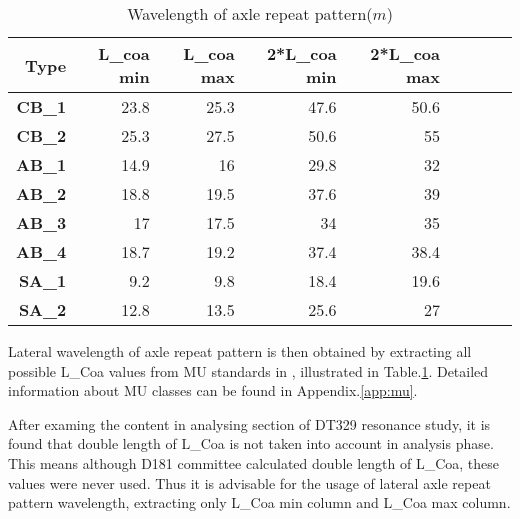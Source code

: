 \begin{table}[h!]
  \centering
  \caption{Wavelength of axle repeat pattern($m$)}
    \begin{tabular}{rrrrrrrrr}
    \toprule
    \textbf{Type} & \textbf{L\_coa min} & \textbf{L\_coa max} & \textbf{2*L\_coa min } & \textbf{2*L\_coa max} \\
    \midrule
    \textbf{CB\_1} & 23.8  & 25.3  & 47.6  & 50.6 \\
    \textbf{CB\_2} & 25.3  & 27.5  & 50.6  & 55    \\
    \textbf{AB\_1} & 14.9  & 16    & 29.8  & 32     \\
    \textbf{AB\_2} & 18.8  & 19.5  & 37.6  & 39    \\
    \textbf{AB\_3} & 17    & 17.5  & 34    & 35   \\
    \textbf{AB\_4} & 18.7  & 19.2  & 37.4  & 38.4  \\
    \textbf{SA\_1} & 9.2   & 9.8   & 18.4  & 19.6  \\
    \textbf{SA\_2} & 12.8  & 13.5  & 25.6  & 27    \\

    \bottomrule
    \end{tabular}%
  \label{tab:wavelengthaxlerepeat}%
\end{table}%

Lateral wavelength of axle repeat pattern is then obtained by extracting all possible L\_Coa values from MU standards in \citet{EC15528}, illustrated in Table.\ref{tab:wavelengthaxlerepeat}. Detailed information about MU classes can be found in Appendix.\ref{app:mu}.


After examing the content in analysing section of DT329 resonance study, it is found that double length of L\_Coa is not taken into account in analysis phase. This means although D181 committee calculated double length of L\_Coa, these values were never used. Thus it is advisable for the usage of lateral axle repeat pattern wavelength, extracting only L\_Coa min column and L\_Coa max column.


